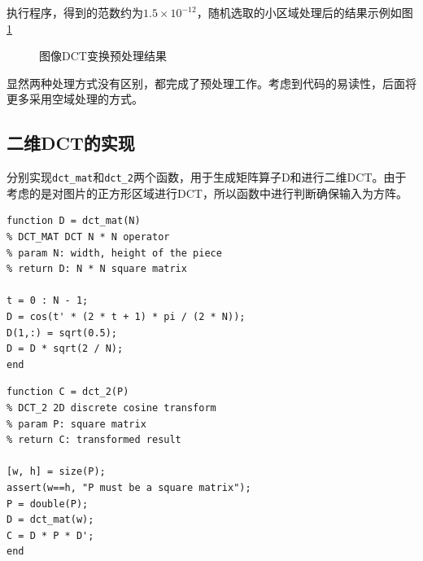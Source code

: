 \documentclass[10pt, a4paper]{article}
\begin{document}
执行程序，得到的范数约为$1.5\times10^{-12}$，随机选取的小区域处理后的结果示例如图\ref{fig:exp2_1}

\begin{figure}[htb!]
    \centering
    \qquad
    \caption{图像DCT变换预处理结果}
    \label{fig:exp2_1}
\end{figure}

显然两种处理方式没有区别，都完成了预处理工作。考虑到代码的易读性，后面将更多采用空域处理的方式。

\subsection{二维DCT的实现}

分别实现\texttt{dct_mat}和\texttt{dct_2}两个函数，用于生成矩阵算子D和进行二维DCT。由于考虑的是对图片的正方形区域进行DCT，所以函数中进行判断确保输入为方阵。

\begin{verbatim}
function D = dct_mat(N)
% DCT_MAT DCT N * N operator
% param N: width, height of the piece
% return D: N * N square matrix

t = 0 : N - 1;
D = cos(t' * (2 * t + 1) * pi / (2 * N));
D(1,:) = sqrt(0.5);
D = D * sqrt(2 / N);
end
\end{verbatim}

\begin{verbatim}
function C = dct_2(P)
% DCT_2 2D discrete cosine transform
% param P: square matrix
% return C: transformed result

[w, h] = size(P);
assert(w==h, "P must be a square matrix");
P = double(P);
D = dct_mat(w);
C = D * P * D';
end
\end{verbatim}
\end{document}
